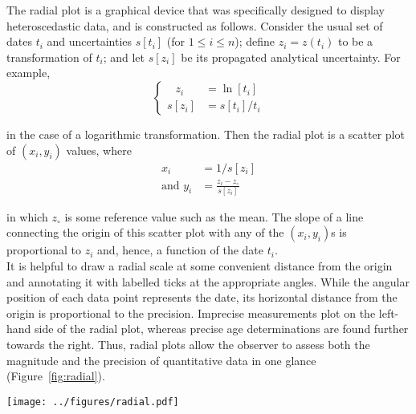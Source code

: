 \begin{refsection}
The radial plot is a graphical device that was specifically designed
to display heteroscedastic data, and is constructed as follows.
Consider the usual set of dates $t_i$ and uncertainties $s[t_i]$ (for
$1 \leq i \leq n$); define $z_i = z(t_i)$ to be a transformation of
$t_i$; and let $s[z_i]$ be its propagated analytical uncertainty.
For example,
\begin{equation}
  \begin{cases}
  \phantom{s[}z_i\phantom{]}\! & \! = \ln[t_i]\\
  s[z_i]\! & \! = s[t_i]/t_i
  \end{cases}
  \label{eq:logtransform}
\end{equation}

\noindent in the case of a logarithmic transformation. Then the radial
plot is a scatter plot of $(x_i,y_i)$ values, where
\begin{equation}
  \begin{split}
    x_i & = 1/s[z_i] \\
    \mbox{and~} y_i & = \frac{z_i-z_\circ}{s[z_i]}
  \end{split}
  \label{eq:radial}
\end{equation}

\noindent in which $z_\circ$ is some reference value such
as the mean. The slope of a line connecting the origin of this scatter
plot with any of the $(x_i,y_i)$s is proportional to $z_i$ and, hence,
a function of the date $t_i$.\\

It is helpful to draw a radial scale at some convenient distance from
the origin and annotating it with labelled ticks at the appropriate
angles. While the angular position of each data point represents the
date, its horizontal distance from the origin is proportional to the
precision. Imprecise measurements plot on the left-hand side of the
radial plot, whereas precise age determinations are found further
towards the right. Thus, radial plots allow the observer to assess
both the magnitude and the precision of quantitative data in one
glance (Figure~\ref{fig:radial}).

\begin{center}
\texttt{[image: ../figures/radial.pdf]}
\end{center}
\begingroup {}
  \label{fig:radial}
\endgroup


\end{refsection}
